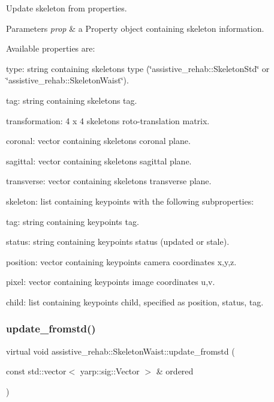 Update skeleton from properties. 


\begin{DoxyParams}{Parameters}
{\em prop} & a Property object containing skeleton information.\\
\hline
\end{DoxyParams}
Available properties are\+:
\begin{DoxyItemize}
\item type\+: string containing skeleton\textquotesingle{}s type (\char`\"{}assistive\+\_\+rehab\+::\+Skeleton\+Std\char`\"{} or \char`\"{}assistive\+\_\+rehab\+::\+Skeleton\+Waist\char`\"{}).
\item tag\+: string containing skeleton\textquotesingle{}s tag.
\item transformation\+: 4 x 4 skeleton\textquotesingle{}s roto-\/translation matrix.
\item coronal\+: vector containing skeleton\textquotesingle{}s coronal plane.
\item sagittal\+: vector containing skeleton\textquotesingle{}s sagittal plane.
\item transverse\+: vector containing skeleton\textquotesingle{}s transverse plane.
\item skeleton\+: list containing keypoints with the following subproperties\+:
\begin{DoxyItemize}
\item tag\+: string containing keypoint\textquotesingle{}s tag.
\item status\+: string containing keypoint\textquotesingle{}s status (updated or stale).
\item position\+: vector containing keypoint\textquotesingle{}s camera coordinates x,y,z.
\item pixel\+: vector containing keypoint\textquotesingle{}s image coordinates u,v.
\item child\+: list containing keypoint\textquotesingle{}s child, specified as position, status, tag. 
\end{DoxyItemize}
\end{DoxyItemize}\mbox{\label{classassistive__rehab_1_1SkeletonWaist_ab7f2e60ea06acf791deb0b44b5a838ce}} 
\subsubsection{\texorpdfstring{update\_fromstd()}{update\_fromstd()}\hspace{0.1cm}{\footnotesize\ttfamily [1/3]}}
{\footnotesize\ttfamily virtual void assistive\+\_\+rehab\+::\+Skeleton\+Waist\+::update\+\_\+fromstd (\begin{DoxyParamCaption}\item[{const std\+::vector$<$ yarp\+::sig\+::\+Vector $>$ \&}]{ordered }\end{DoxyParamCaption})\hspace{0.3cm}{\ttfamily [virtual]}}



